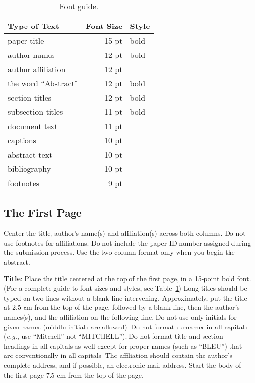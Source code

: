 \documentclass[11pt,a4paper]{article}
\begin{document}
\begin{table}[t!]
\begin{center}
\begin{tabular}{|l|rl|}
\hline \textbf{Type of Text} & \textbf{Font Size} & \textbf{Style} \\ \hline
paper title & 15 pt & bold \\
author names & 12 pt & bold \\
author affiliation & 12 pt & \\
the word ``Abstract'' & 12 pt & bold \\
section titles & 12 pt & bold \\
subsection titles & 11 pt & bold \\
document text & 11 pt  &\\
captions & 10 pt & \\
abstract text & 10 pt & \\
bibliography & 10 pt & \\
footnotes & 9 pt & \\
\hline
\end{tabular}
\end{center}
\caption{\label{font-table} Font guide. }
\end{table}

\subsection{The First Page}
\label{ssec:first}

Center the title, author's name(s) and affiliation(s) across both
columns. Do not use footnotes for affiliations. Do not include the
paper ID number assigned during the submission process. Use the
two-column format only when you begin the abstract.

\textbf{Title}: Place the title centered at the top of the first page, in
a 15-point bold font. (For a complete guide to font sizes and styles,
see Table~\ref{font-table}) Long titles should be typed on two lines
without a blank line intervening. Approximately, put the title at 2.5
cm from the top of the page, followed by a blank line, then the
author's names(s), and the affiliation on the following line. Do not
use only initials for given names (middle initials are allowed). Do
not format surnames in all capitals (\emph{e.g.}, use ``Mitchell'' not
``MITCHELL'').  Do not format title and section headings in all
capitals as well except for proper names (such as ``BLEU'') that are
conventionally in all capitals.  The affiliation should contain the
author's complete address, and if possible, an electronic mail
address. Start the body of the first page 7.5 cm from the top of the
page.
\end{document}
